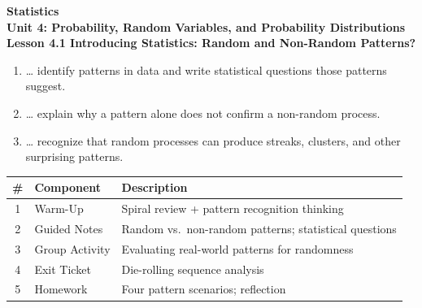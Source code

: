 \documentclass[10pt]{article}
\begin{document}
\vspace{-0.8in}

\begin{center}
  {\color{white}\textbf{\LARGE Statistics}}\\[4pt]
  {\color{skymid}\large\textbf{Unit 4: Probability, Random Variables, and Probability Distributions}}\\[6pt]
  {\color{white}\textbf{\large Lesson 4.1 \quad Introducing Statistics: Random and Non-Random Patterns?}}
\end{center}

\vspace{0.22in}
\namedateperiod
\vspace{0.18in}

\begin{learningtargetbox}
\small
\begin{enumerate}[leftmargin=1.5em, itemsep=5pt]
  \item \ldots{} identify patterns in data and write statistical questions those patterns suggest.
  \item \ldots{} explain why a pattern alone does not confirm a non-random process.
  \item \ldots{} recognize that random processes can produce streaks, clusters, and other surprising patterns.
\end{enumerate}
\end{learningtargetbox}

\vspace{0.14in}

\begin{tocbox}
\small
\renewcommand{\arraystretch}{1.5}
\begin{tabularx}{\linewidth}{@{} c l X @{}}
\rowcolor{sky}
\textbf{\#} & \textbf{Component} & \textbf{Description} \\
\midrule
1 & Warm-Up       & Spiral review + pattern recognition thinking \\
2 & Guided Notes  & Random vs.\ non-random patterns; statistical questions \\
3 & Group Activity & Evaluating real-world patterns for randomness \\
4 & Exit Ticket   & Die-rolling sequence analysis \\
5 & Homework      & Four pattern scenarios; reflection \\
\end{tabularx}
\end{tocbox}
\end{document}
